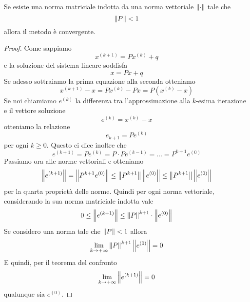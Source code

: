 \begin{theorem}
	Se esiste una norma matriciale indotta da una norma vettoriale $\left\lVert\cdot\right\rVert$ tale che
	\[ \left\lVert P\right\rVert < 1 \]
	allora il metodo è convergente.
	\begin{proof}
		Come sappiamo
		\[ x^{(k+1)} = P x^{(k)} + q \]
		e la soluzione del sistema lineare soddisfa
		\[ x = P x + q \]
		Se adesso sottraiamo la prima equazione alla seconda otteniamo
		\[ x^{(k+1)} - x = P x^{(k)} - P x = P (x^{(k)} - x) \]
		Se noi chiamiamo $e^{(k)}$ la differenza tra l'approssimazione alla $k$-esima iterazione e il vettore
		soluzione
		\[ e^{(k)} = x^{(k)} - x \]
		otteniamo la relazione
		\[ e_{k+1} = P e^{(k)} \]
		per ogni $k \geq 0$. Questo ci dice inoltre che
		\[ e^{(k+1)} = P e^{(k)} = P \cdot P e^{(k-1)} = \dots = P^{k+1} e^{(0)} \]
		Passiamo ora alle norme vettoriali e otteniamo
		\[
			\left\lVert e^{(k+1)}\right\rVert = \left\lVert P^{k+1} e^{(0)}\right\rVert \leq
			\left\lVert P^{k+1}\right\rVert \left\lVert e^{(0)}\right\rVert \leq \left\lVert P^{k+1}\right\rVert \left\lVert e^{(0)}\right\rVert
		\]
		per la quarta proprietà delle norme. Quindi per ogni norma vettoriale, considerando la sua norma
		matriciale indotta vale
		\[ 0 \leq \left\lVert e^{(k+1)}\right\rVert \leq \left\lVert P\right\rVert^{k+1} \cdot \left\lVert e^{(0)}\right\rVert \]
		Se considero una norma tale che $\left\lVert P\right\rVert < 1$ allora
		\[ \lim_{k \to +\infty} \left\lVert P\right\rVert^{k+1} \left\lVert e^{(0)}\right\rVert = 0 \]
		E quindi, per il teorema del confronto
		\[ \lim_{k \to +\infty} \left\lVert e^{(k+1)}\right\rVert = 0 \]
		qualunque sia $e^{(0)}$.
	\end{proof}
\end{theorem}

